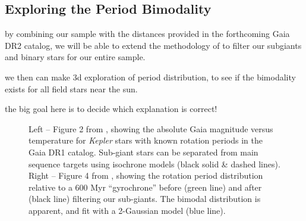 \documentclass[12pt]{article}
\newcommand{\Kepler}{\textsl{Kepler}\xspace}
\begin{document}
\subsection{Exploring the Period Bimodality}
by combining our sample with the distances provided in the forthcoming Gaia DR2 catalog, we will be able to extend the methodology of \citet{davenport2017} to filter our subgiants and binary stars for our entire sample.

we then can make 3d exploration of period distribution, to see if the bimodality exists for all field stars near the sun.

the big goal here is to decide which explanation is correct!

\begin{figure}[!th]
\centering
{}
\caption{Left -- Figure 2 from \citet{davenport2017}, showing the absolute Gaia magnitude versus temperature for \Kepler stars with known rotation periods in the Gaia DR1 catalog. Sub-giant stars can be separated from main sequence targets using isochrone models (black solid \& dashed lines). Right -- Figure 4 from \citet{davenport2017}, showing the rotation period distribution relative to a 600 Myr ``gyrochrone'' before (green line) and after (black line) filtering our sub-giants. The bimodal distribution is apparent, and fit with a 2-Gaussian model (blue line).}
\label{fig:cmd}
\end{figure}
\end{document}
